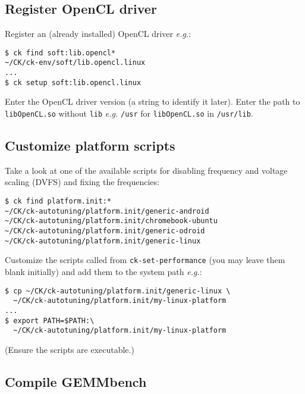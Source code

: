\documentclass{acm_proc_article-sp} %
\begin{document}
\subsection{Register OpenCL driver}

Register an (already installed) OpenCL driver {\em e.g.}:
%
\begin{verbatim}
$ ck find soft:lib.opencl*
~/CK/ck-env/soft/lib.opencl.linux
...
$ ck setup soft:lib.opencl.linux
\end{verbatim}

Enter the OpenCL driver version (a string to identify it later). Enter the path
to \verb|libOpenCL.so| without \verb|lib| {\em e.g.} \verb|/usr| for
\verb|libOpenCL.so| in \verb|/usr/lib|.

\subsection{Customize platform scripts}

Take a look at one of the available scripts for disabling frequency and voltage
scaling (DVFS) and fixing the frequencies:
%
\begin{verbatim}
$ ck find platform.init:*
~/CK/ck-autotuning/platform.init/generic-android
~/CK/ck-autotuning/platform.init/chromebook-ubuntu
~/CK/ck-autotuning/platform.init/generic-odroid
~/CK/ck-autotuning/platform.init/generic-linux
\end{verbatim}

Customize the scripts called from {\tt ck-set-performance} (you may leave them
blank initially) and add them to the system path {\em e.g.}:
\begin{verbatim}
$ cp ~/CK/ck-autotuning/platform.init/generic-linux \
  ~/CK/ck-autotuning/platform.init/my-linux-platform
...
$ export PATH=$PATH:\
  ~/CK/ck-autotuning/platform.init/my-linux-platform
\end{verbatim}
(Ensure the scripts are executable.)

\subsection{Compile GEMMbench}
\end{document}
